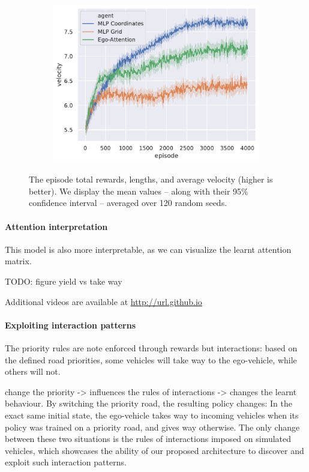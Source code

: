 \documentclass{article}
\begin{document}
{\begin{figure}[tp]
\begin{subfigure}[t]{.49\linewidth}
		\centering\includegraphics[width=\linewidth]{img/velocity}
	\end{subfigure}
 \caption{The episode total rewards, lengths, and average velocity (higher is better). We display the mean values -- along with their 95\% confidence interval -- averaged over 120 random seeds.}
 \label{fig:results}
\end{figure}

\paragraph{Attention interpretation}

This model is also more interpretable, as we can visualize the learnt attention matrix.

TODO: figure yield vs take way

Additional videos are available at \url{http://url.github.io}

\paragraph{Exploiting interaction patterns}
The priority rules are note enforced through rewards but interactions: based on the defined road priorities, some vehicles will take way to the ego-vehicle, while others will not.

change the priority -> influences the rules of interactions -> changes the learnt behaviour.
By switching the priority road, the resulting policy changes: In the exact same initial state, the ego-vehicle takes way to incoming vehicles when its policy was trained on a priority road, and gives way otherwise. The only change between these two situations is the rules of interactions imposed on simulated vehicles, which showcases the ability of our proposed architecture to discover and exploit such interaction patterns.


}
\end{document}
